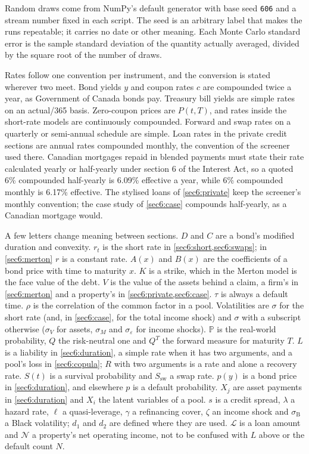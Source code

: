 \begin{chapterrefs}
\begin{keybox}
Random draws come from NumPy's default generator with base seed \texttt{606} and a stream number
fixed in each script. The seed is an arbitrary label that makes the runs repeatable; it carries no
date or other meaning. Each Monte Carlo standard error is the sample standard deviation of the
quantity actually averaged, divided by the square root of the number of draws.

Rates follow one convention per instrument, and the conversion is stated wherever two meet. Bond
yields $y$ and coupon rates $c$ are compounded twice a year, as Government of Canada bonds pay.
Treasury bill yields are simple rates on an actual/365 basis. Zero-coupon prices are $P(t,T)$, and
rates inside the short-rate models are continuously compounded. Forward and swap rates on a
quarterly or semi-annual schedule are simple. Loan rates in the private credit sections are annual
rates compounded monthly, the convention of the screener used there. Canadian mortgages repaid in
blended payments must state their rate calculated yearly or half-yearly under section 6 of the
Interest Act, so a quoted 6\% compounded half-yearly is 6.09\% effective a year, while 6\% compounded
monthly is 6.17\% effective. The stylised loans of \cref{sec6:private} keep the screener's monthly
convention; the case study of \cref{sec6:case} compounds half-yearly, as a Canadian mortgage would.

A few letters change meaning between sections. $D$ and $C$ are a bond's modified duration and
convexity. $r_t$ is the short rate in \cref{sec6:short,sec6:swaps}; in \cref{sec6:merton} $r$ is a
constant rate. $A(x)$ and $B(x)$ are the coefficients of a bond price with time to maturity $x$.
$K$ is a strike, which in the Merton model is the face value of the debt. $V$ is the value of the
assets behind a claim, a firm's in \cref{sec6:merton} and a property's in
\cref{sec6:private,sec6:case}. $\tau$ is always a default time. $\rho$ is the correlation of the
common factor in a pool. Volatilities are $\sigma$ for the short rate (and, in \cref{sec6:case}, for the total income shock)
and $\sigma$ with a subscript
otherwise ($\sigma_V$ for assets, $\sigma_M$ and $\sigma_\varepsilon$ for income shocks). $\mathbb P$
is the real-world probability, $Q$ the risk-neutral one and $Q^T$ the forward measure for maturity $T$.
$L$ is a liability in \cref{sec6:duration}, a simple rate when it has two arguments, and a pool's loss
in \cref{sec6:copula}; $R$ with two arguments is a rate and alone a recovery rate. $S(t)$ is a
survival probability and $S_{\mathrm{sw}}$ a swap rate. $p(y)$ is a bond price in
\cref{sec6:duration}, and elsewhere $p$ is a default probability. $X_j$ are asset payments in
\cref{sec6:duration} and $X_i$ the latent variables of a pool. $s$ is a credit spread, $\lambda$ a
hazard rate, $\ell$ a quasi-leverage, $\gamma$ a refinancing cover, $\zeta$ an income shock and
$\sigma_{\mathrm B}$ a Black volatility; $d_1$ and $d_2$ are defined where they are used. $\mathcal L$ is a loan amount and $\mathcal N$ a
property's net operating income, not to be confused with $L$ above or the default count $N$.
\end{keybox}


\end{chapterrefs}
